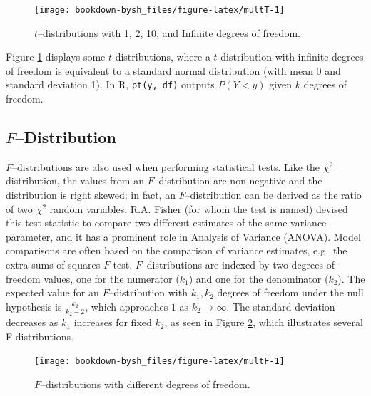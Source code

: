 \documentclass[
]{krantz}
\begin{document}
\begin{figure}

{\centering \texttt{[image: bookdown-bysh\_files/figure-latex/multT-1]} 

}

\caption{\(t\)--distributions with 1, 2, 10, and Infinite degrees of freedom.}\label{fig:multT}
\end{figure}

Figure \ref{fig:multT} displays some \(t\)-distributions, where a \(t\)-distribution with infinite degrees of freedom is equivalent to a standard normal distribution (with mean 0 and standard deviation 1). In R, \texttt{pt(y,\ df)} outputs \(P(Y < y)\) given \(k\) degrees of freedom.

\hypertarget{fdistribution}{%
\subsection{\texorpdfstring{\(F\)--Distribution}{F--Distribution}}\label{fdistribution}}

\(F\)--distributions  are also used when performing statistical tests. Like the \(\chi^2\) distribution, the values from an \(F\)--distribution are non-negative and the distribution is right skewed; in fact, an \(F\)--distribution can be derived as the ratio of two \(\chi^2\) random variables. R.A. Fisher (for whom the test is named) devised this test statistic to compare two different estimates of the same variance parameter, and it has a prominent role in Analysis of Variance (ANOVA). Model comparisons are often based on the comparison of variance estimates, e.g.~the extra sums-of-squares \(F\) test. \(F\)--distributions are indexed by two degrees-of-freedom values, one for the numerator (\(k_1\)) and one for the denominator (\(k_2\)). The expected value for an \(F\)--distribution with \(k_1, k_2\) degrees of freedom under the null hypothesis is \(\frac{k_2}{k_2 - 2}\), which approaches \(1\) as \(k_2 \rightarrow \infty\). The standard deviation decreases as \(k_1\) increases for fixed \(k_2\), as seen in Figure \ref{fig:multF}, which illustrates several F distributions.



\begin{figure}

{\centering \texttt{[image: bookdown-bysh\_files/figure-latex/multF-1]} 

}

\caption{\(F\)--distributions with different degrees of freedom.}\label{fig:multF}
\end{figure}
\end{document}
